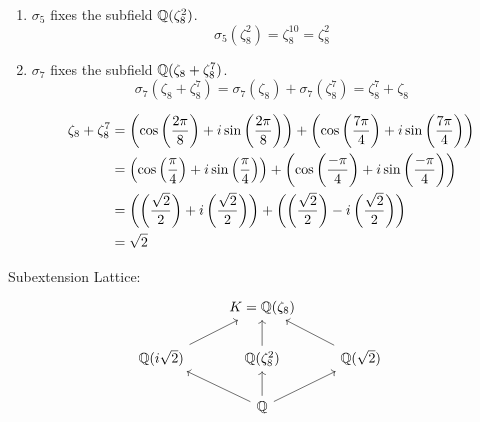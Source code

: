 \documentclass[12pt]{article}
\begin{document}
\begin{solution}
\begin{enumerate}
        \item  $\sigma_5$ fixes the subfield $\mathbb Q(\zeta_8^2)$. 
        \[\sigma_5(\zeta_8^2) = \zeta_8^{10} = \zeta_8^2\]


        \item  $\sigma_7$ fixes the subfield $\mathbb Q(\zeta_8 + \zeta_8^7)$. 
        \[\sigma_7(\zeta_8 + \zeta_8^7) = \sigma_7(\zeta_8 )+ \sigma_7(\zeta_8^7) = \zeta_8^7 + \zeta_8 \]

        \begin{align*}
            \zeta_8 + \zeta_8^7 &= \left(\cos\left(\frac{2\pi}{8}\right) + i \sin \left(\frac{2\pi}{8}\right)\right)  + \left(\cos\left(\frac{7\pi}{4}\right) + i \sin \left(\frac{7\pi}{4}\right)\right) \\ 
            &=\left(\cos\left(\frac{\pi}{4}\right) + i \sin \left(\frac{\pi}{4}\right)\right) + \left(\cos\left(\frac{-\pi}{4}\right) + i \sin \left(\frac{-\pi}{4}\right)\right)  \\ 
            &= \left(\left(\frac{\sqrt{2}}{2}\right) + i \left(\frac{\sqrt{2}}{2}\right)\right) + \left(\left(\frac{\sqrt{2}}{2}\right) - i \left(\frac{\sqrt{2}}{2}\right)\right)\\
            &= \sqrt{2} 
        \end{align*}
    \end{enumerate}
   
    Subextension Lattice:
    \[
    \begin{tikzcd}
    & K = \Q(\zeta_8)  & \\
    \Q(i\sqrt{2}) \arrow[ur] & 
    \Q(\zeta_8^2) \arrow[u] & 
    \Q(\sqrt{2}) \arrow[ul] \\
    & \Q \arrow[ul] \arrow[u] \arrow[ur]&
    \end{tikzcd}
    \]
\end{solution}
\end{document}
